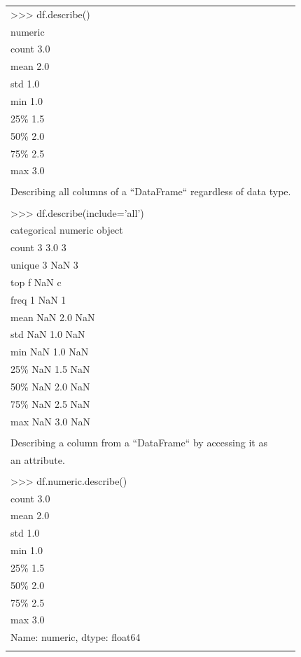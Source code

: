 \documentclass[11pt]{article}
\begin{document}
\begin{enumerate}
\begin{enumerate}
\begin{enumerate}
\begin{center}
\begin{tabular}{l}
>>> df.describe()\\
numeric\\
count      3.0\\
mean       2.0\\
std        1.0\\
min        1.0\\
25\%        1.5\\
50\%        2.0\\
75\%        2.5\\
max        3.0\\
\\
Describing all columns of a ``DataFrame`` regardless of data type.\\
\\
>>> df.describe(include='all')\\
categorical  numeric object\\
count            3      3.0      3\\
unique           3      NaN      3\\
top              f      NaN      c\\
freq             1      NaN      1\\
mean           NaN      2.0    NaN\\
std            NaN      1.0    NaN\\
min            NaN      1.0    NaN\\
25\%            NaN      1.5    NaN\\
50\%            NaN      2.0    NaN\\
75\%            NaN      2.5    NaN\\
max            NaN      3.0    NaN\\
\\
Describing a column from a ``DataFrame`` by accessing it as\\
an attribute.\\
\\
>>> df.numeric.describe()\\
count    3.0\\
mean     2.0\\
std      1.0\\
min      1.0\\
25\%      1.5\\
50\%      2.0\\
75\%      2.5\\
max      3.0\\
Name: numeric, dtype: float64\\
\\

\end{tabular}
\end{center}
\end{enumerate}
\end{enumerate}
\end{enumerate}
\end{document}
